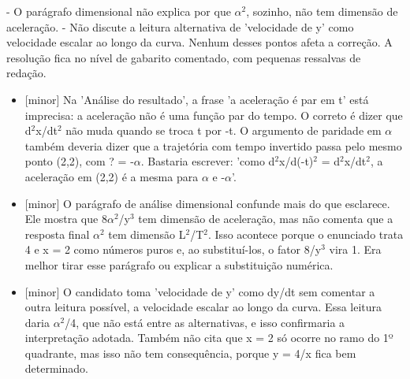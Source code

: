 \documentclass{article}%
\begin{document}
{-} O parágrafo dimensional não explica por que $\alpha$$^2$, sozinho, não tem dimensão de aceleração.\newline%
{-} Não discute a leitura alternativa de 'velocidade de y' como velocidade escalar ao longo da curva.\newline%
\newline%
Nenhum desses pontos afeta a correção. A resolução fica no nível de gabarito comentado, com pequenas ressalvas de redação.%
\begin{itemize}%
\item%
{[}minor{]} Na 'Análise do resultado', a frase 'a aceleração é par em t' está imprecisa: a aceleração não é uma função par do tempo. O correto é dizer que d$^2$x/dt$^2$ não muda quando se troca t por -t. O argumento de paridade em $\alpha$ também deveria dizer que a trajetória com tempo invertido passa pelo mesmo ponto (2,2), com ? = -$\alpha$. Bastaria escrever: 'como d$^2$x/d(-t)$^2$ = d$^2$x/dt$^2$, a aceleração em (2,2) é a mesma para $\alpha$ e -$\alpha$'.%
\item%
{[}minor{]} O parágrafo de análise dimensional confunde mais do que esclarece. Ele mostra que 8$\alpha$$^2$/y$^3$ tem dimensão de aceleração, mas não comenta que a resposta final $\alpha$$^2$ tem dimensão L$^2$/T$^2$. Isso acontece porque o enunciado trata 4 e x = 2 como números puros e, ao substituí{-}los, o fator 8/y$^3$ vira 1. Era melhor tirar esse parágrafo ou explicar a substituição numérica.%
\item%
{[}minor{]} O candidato toma 'velocidade de y' como dy/dt sem comentar a outra leitura possível, a velocidade escalar ao longo da curva. Essa leitura daria $\alpha$$^2$/4, que não está entre as alternativas, e isso confirmaria a interpretação adotada. Também não cita que x = 2 só ocorre no ramo do 1º quadrante, mas isso não tem consequência, porque y = 4/x fica bem determinado.%
\end{itemize}%
\end{document}
